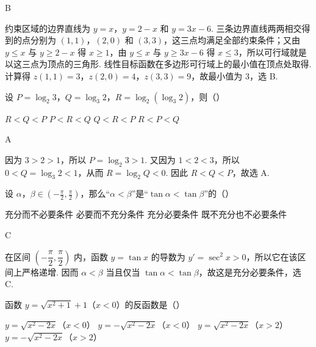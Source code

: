 \begin{answer}
B
\end{answer}

\begin{solution}
约束区域的边界直线为 \(y=x\)，\(y=2-x\) 和 \(y=3x-6\). 三条边界直线两两相交得到的点分别为 \((1,1)\)，\((2,0)\) 和 \((3,3)\)，这三点均满足全部约束条件；又由 \(y\leqslant x\) 与 \(y\geqslant2-x\) 得 \(x\geqslant1\)，由 \(y\leqslant x\) 与 \(y\geqslant3x-6\) 得 \(x\leqslant3\)，所以可行域就是以这三点为顶点的三角形. 线性目标函数在多边形可行域上的最小值在顶点处取得. 计算得 \(z(1,1)=3\)，\(z(2,0)=4\)，\(z(3,3)=9\)，故最小值为 \(3\)，选 B.
\end{solution}

\begin{problem}
设 \(P = \log_2 3\)，\(Q = \log_3 2\)，\(R = \log_2(\log_3 2)\)，则（\quad）

\choices
    {\(R < Q < P\)}
    {\(P < R < Q\)}
    {\(Q < R < P\)}
    {\(R < P < Q\)}
\end{problem}

\begin{answer}
A
\end{answer}

\begin{solution}
因为 \(3>2>1\)，所以 \(P=\log_2 3>1\). 又因为 \(1<2<3\)，所以 \(0<Q=\log_3 2<1\)，从而 \(R=\log_2 Q<0\). 因此 \(R<Q<P\)，故选 A.
\end{solution}

\begin{problem}
设 \(\alpha\)，\(\beta \in \left(-\frac{\pi}{2}, \frac{\pi}{2}\right)\)，那么“\(\alpha < \beta\)”是“\(\tan \alpha < \tan \beta\)”的（\quad）

\choices
    {充分而不必要条件}
    {必要而不充分条件}
    {充分必要条件}
    {既不充分也不必要条件}
\end{problem}

\begin{answer}
C
\end{answer}

\begin{solution}
在区间 \(\left(-\dfrac{\pi}{2},\dfrac{\pi}{2}\right)\) 内，函数 \(y=\tan x\) 的导数为 \(y'=\sec^2x>0\)，所以它在该区间上严格递增. 因而 \(\alpha<\beta\) 当且仅当 \(\tan\alpha<\tan\beta\)，故这是充分必要条件，选 C.
\end{solution}

\begin{problem}
函数 \(y = \sqrt{x^2 + 1} + 1\)（\(x < 0\)）的反函数是（\quad）

\choices
    {\(y = \sqrt{x^2 - 2x}\)（\(x < 0\)）}
    {\(y = -\sqrt{x^2 - 2x}\)（\(x < 0\)）}
    {\(y = \sqrt{x^2 - 2x}\)（\(x > 2\)）}
    {\(y = -\sqrt{x^2 - 2x}\)（\(x > 2\)）}
\end{problem}

